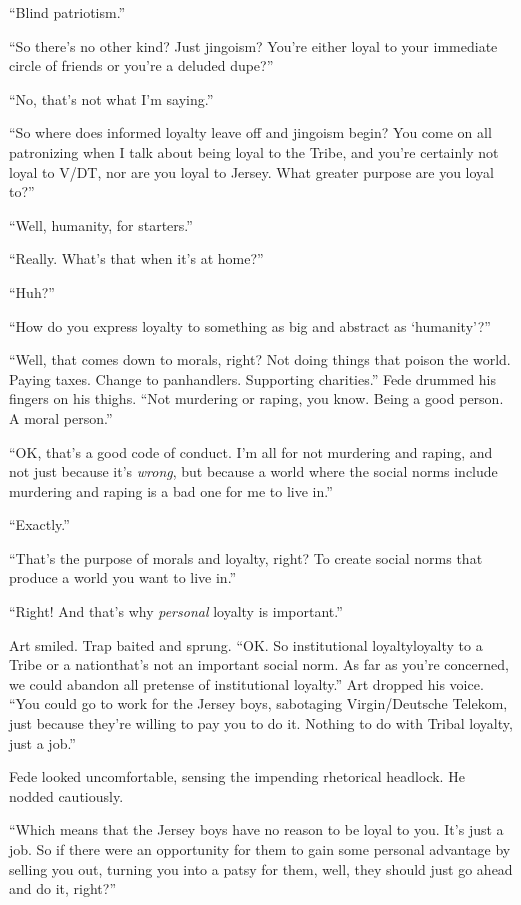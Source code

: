 “Blind patriotism.”

“So there’s no other kind? Just jingoism? You’re either loyal to
your immediate circle of friends or you’re a deluded dupe?”

“No, that’s not what I’m saying.”

“So where does informed loyalty leave off and jingoism begin? You
come on all patronizing when I talk about being loyal to the Tribe,
and you’re certainly not loyal to V/DT, nor are you loyal to
Jersey. What greater purpose are you loyal to?”

“Well, humanity, for starters.”

“Really. What’s that when it’s at home?”

“Huh?”

“How do you express loyalty to something as big and abstract as
‘humanity’?”

“Well, that comes down to morals, right? Not doing things that
poison the world. Paying taxes. Change to panhandlers. Supporting
charities.” Fede drummed his fingers on his thighs. “Not murdering
or raping, you know. Being a good person. A moral person.”

“OK, that’s a good code of conduct. I’m all for not murdering and
raping, and not just because it’s \emph{wrong}, but because a world
where the social norms include murdering and raping is a bad one
for me to live in.”

“Exactly.”

“That’s the purpose of morals and loyalty, right? To create social
norms that produce a world you want to live in.”

“Right! And that’s why \emph{personal} loyalty is important.”

Art smiled. Trap baited and sprung. “OK. So institutional
loyalty{\dash}loyalty to a Tribe or a nation{\dash}that’s not an important
social norm. As far as you’re concerned, we could abandon all
pretense of institutional loyalty.” Art dropped his voice. “You
could go to work for the Jersey boys, sabotaging Virgin/Deutsche
Telekom, just because they’re willing to pay you to do it. Nothing
to do with Tribal loyalty, just a job.”

Fede looked uncomfortable, sensing the impending rhetorical
headlock. He nodded cautiously.

“Which means that the Jersey boys have no reason to be loyal to
you. It’s just a job. So if there were an opportunity for them to
gain some personal advantage by selling you out, turning you into a
patsy for them, well, they should just go ahead and do it, right?”

